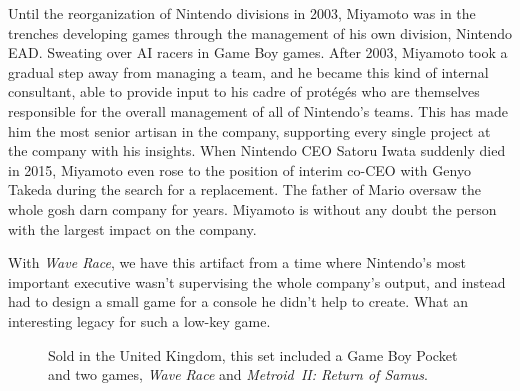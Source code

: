\documentclass{book}
\begin{document}
Until the reorganization of Nintendo divisions in 2003, Miyamoto was in the trenches developing games through the management of his own division, Nintendo EAD. Sweating over AI racers in Game Boy games. After 2003, Miyamoto took a gradual step away from managing a team, and he became this kind of internal consultant, able to provide input to his cadre of protégés who are themselves responsible for the overall management of all of Nintendo’s teams. This has made him the most senior artisan in the company, supporting every single project at the company with his insights. When Nintendo CEO Satoru Iwata suddenly died in 2015, Miyamoto even rose to the position of interim co-CEO with Genyo Takeda during the search for a replacement. The father of Mario oversaw the whole gosh darn company for years. Miyamoto is without any doubt the person with the largest impact on the company.\par
With \emph{Wave Race}, we have this artifact from a time where Nintendo’s most important executive wasn’t supervising the whole company’s output, and instead had to design a small game for a console he didn’t help to create. What an interesting legacy for such a low-key game.\par
\FloatBarrier\vspace{\baselineskip}\begin{figure}[H]\caption*{Sold in the United Kingdom, this set included a Game Boy Pocket and two games, \emph{Wave Race} and \emph{Metroid~II: Return of Samus}.}\end{figure}
\end{document}
